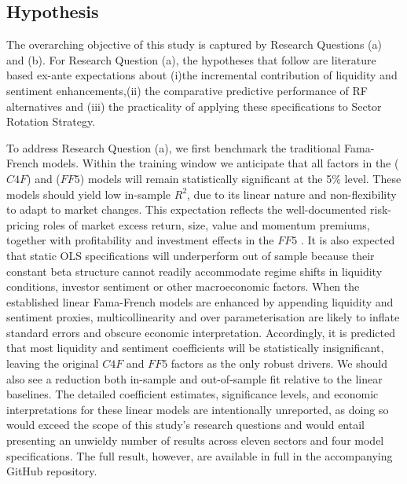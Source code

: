 
\subsection{Hypothesis}
The overarching objective of this study is captured by Research Questions (a) and (b). For Research Question (a), the hypotheses that follow are literature based ex-ante expectations about (i)the incremental contribution of liquidity and sentiment enhancements,(ii) the comparative predictive performance of RF alternatives and (iii) the practicality of applying these specifications to Sector Rotation Strategy.

To address Research Question (a), we first benchmark the traditional Fama-French models. Within the training window we anticipate that all factors in the ($C4F$) and ($FF5$) models will remain statistically significant at the 5\% level. These models should yield low in-sample $R^{2}$, due to its linear nature and non-flexibility to adapt to market changes. This expectation reflects the well-documented risk-pricing roles of market excess return, size, value and momentum premiums, together with profitability and investment effects in the $FF5$ \cite{ff5_2015,cahart_1997}. It is also expected that static OLS specifications will underperform out of sample because their constant beta structure cannot readily accommodate regime shifts in liquidity conditions, investor sentiment or other macroeconomic factors.  When the established linear Fama-French models are enhanced by appending liquidity and sentiment proxies, multicollinearity and over parameterisation are likely to inflate standard errors and obscure economic interpretation. Accordingly, it is predicted that most liquidity and sentiment coefficients will be statistically insignificant, leaving the original $C4F$ and $FF5$ factors
as the only robust drivers. We should also see a reduction both in-sample and out-of-sample fit relative to the linear baselines. The detailed coefficient estimates, significance levels, and economic interpretations for these linear models are intentionally unreported, as doing so would exceed the scope of this study's research questions and would entail presenting an unwieldy number of results across eleven sectors and four model specifications. The full result, however, are available in full in the accompanying GitHub repository.


